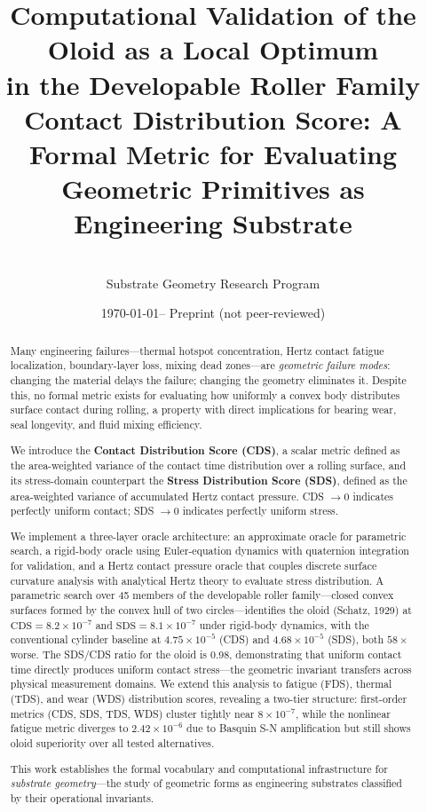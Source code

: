 \documentclass[11pt,a4paper]{article}
\title{%
  \textbf{Computational Validation of the Oloid as a Local Optimum\\
  in the Developable Roller Family}\\[8pt]
  \large Contact Distribution Score: A Formal Metric for Evaluating\\
  Geometric Primitives as Engineering Substrate%
}
\author{
  \\[4pt]
  \small Substrate Geometry Research Program
}
\date{\today \quad -- \quad Preprint (not peer-reviewed)}
\begin{document}
\maketitle


\begin{abstract}
Many engineering failures---thermal hotspot concentration, Hertz contact
fatigue localization, boundary-layer loss, mixing dead zones---are
\emph{geometric failure modes}: changing the material delays the failure;
changing the geometry eliminates it. Despite this, no formal metric exists
for evaluating how uniformly a convex body distributes surface contact
during rolling, a property with direct implications for bearing wear,
seal longevity, and fluid mixing efficiency.

We introduce the \textbf{Contact Distribution Score (CDS)}, a scalar
metric defined as the area-weighted variance of the contact time
distribution over a rolling surface, and its stress-domain counterpart
the \textbf{Stress Distribution Score (SDS)}, defined as the
area-weighted variance of accumulated Hertz contact pressure. CDS
$\to 0$ indicates perfectly uniform contact; SDS $\to 0$ indicates
perfectly uniform stress.

We implement a three-layer oracle architecture: an approximate oracle
for parametric search, a rigid-body oracle using Euler-equation dynamics
with quaternion integration for validation, and a Hertz contact pressure
oracle that couples discrete surface curvature analysis with analytical
Hertz theory to evaluate stress distribution. A parametric search over
45 members of the developable roller family---closed convex surfaces
formed by the convex hull of two circles---identifies the oloid
(Schatz, 1929) at $\mathrm{CDS} = 8.2 \times 10^{-7}$ and
$\mathrm{SDS} = 8.1 \times 10^{-7}$ under rigid-body dynamics, with
the conventional cylinder baseline at $4.75 \times 10^{-5}$ (CDS) and
$4.68 \times 10^{-5}$ (SDS), both $58\times$ worse. The SDS/CDS ratio
for the oloid is 0.98, demonstrating that uniform contact time directly
produces uniform contact stress---the geometric invariant transfers
across physical measurement domains.
We extend this analysis to fatigue (FDS), thermal (TDS), and wear (WDS) distribution scores, revealing a two-tier structure: first-order metrics (CDS, SDS, TDS, WDS) cluster tightly near $8 \times 10^{-7}$, while the nonlinear fatigue metric diverges to $2.42 \times 10^{-6}$ due to Basquin S-N amplification but still shows oloid superiority over all tested alternatives.

This work establishes the formal vocabulary and computational
infrastructure for \emph{substrate geometry}---the study of geometric
forms as engineering substrates classified by their operational invariants.
\end{abstract}
\end{document}
